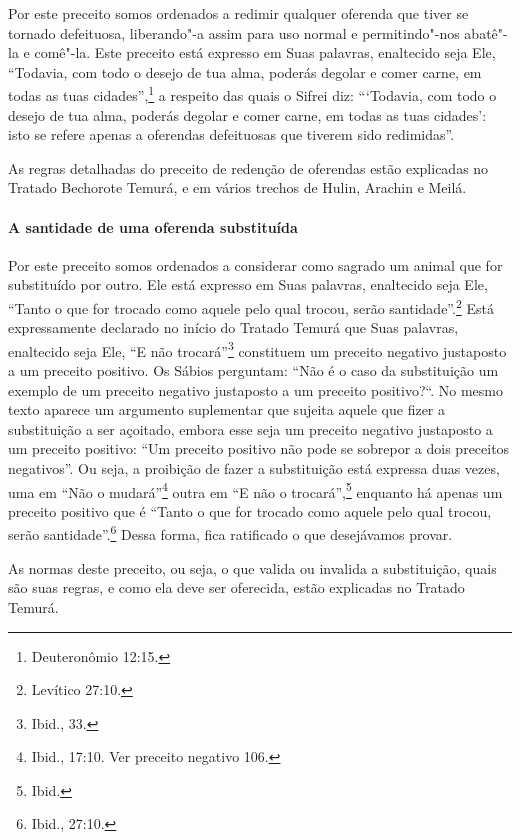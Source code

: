 \begin{multicols}{2}
Por este preceito somos ordenados a redimir qualquer oferenda que tiver
se tornado defeituosa, liberando"-a assim para uso normal e
permitindo"-nos abatê"-la e comê"-la. Este preceito está expresso em Suas
palavras, enaltecido seja Ele, ``Todavia, com todo o desejo de tua alma,
poderás degolar e comer carne, em todas as tuas cidades'',\footnote{Deuteronômio
12:15.} a respeito das quais o Sifrei\starr{} diz: ```Todavia, com todo o desejo
de tua alma, poderás degolar e comer carne, em todas as tuas cidades':
isto se refere apenas a oferendas defeituosas que tiverem sido
redimidas''.

As regras detalhadas do preceito de redenção de oferendas estão
explicadas no Tratado Bechorot\starr e Temurá\starr, e em vários trechos de Hulin\starr,
Arachin\starr{} e Meilá\starr.

\paragraph{A santidade de uma oferenda substituída}

Por este preceito somos ordenados a considerar como sagrado um animal
que for substituído por outro. Ele está expresso em Suas palavras,
enaltecido seja Ele, ``Tanto o que for trocado como aquele pelo qual
trocou, serão santidade''.\footnote{Levítico 27:10.} Está expressamente
declarado no início do Tratado Temurá\starr{} que Suas palavras, enaltecido
seja Ele, ``E não trocará''\footnote{Ibid., 33.} constituem um preceito negativo
justaposto a um preceito positivo. Os Sábios perguntam: ``Não é o caso
da substituição um exemplo de um preceito negativo justaposto a um
preceito positivo?``. No mesmo texto aparece um argumento suplementar
que sujeita aquele que fizer a substituição a ser açoitado, embora esse
seja um preceito negativo justaposto a um preceito positivo: ``Um
preceito positivo não pode se sobrepor a dois preceitos negativos''. Ou
seja, a proibição de fazer a substituição está expressa duas vezes, uma
em ``Não o mudará''\footnote{Ibid., 17:10. Ver preceito negativo 106.} outra em ``E
não o trocará'',\footnote{Ibid.} enquanto há apenas um preceito positivo que é
``Tanto o que for trocado como aquele pelo qual trocou, serão
santidade''.\footnote{Ibid., 27:10.} Dessa forma, fica ratificado o que
desejávamos provar.

As normas deste preceito, ou seja, o que valida ou invalida a
substituição, quais são suas regras, e como ela deve ser oferecida,
estão explicadas no Tratado Temurá\starr.


\end{multicols}

